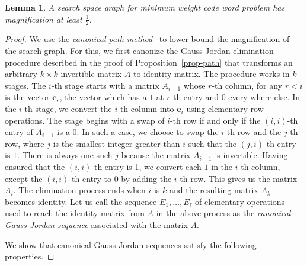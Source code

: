 \documentclass{sig-alternate-2013}
\newtheorem{lemma}[theorem]{Lemma}
\begin{document}
\begin{lemma}
  \label{lem-magnification}
  A search space graph for minimum weight code word problem has
  magnification at least $\frac{1}{2}$.
\end{lemma}
\begin{proof}
  We use the \emph{canonical path
    method}~\cite{cannonical-path-reference} to lower-bound the
  magnification of the search graph. For this, we first canonize the
  Gauss-Jordan elimination procedure described in the proof of
  Proposition~\ref{prop-path} that transforms an arbitrary $k\times k$
  invertible matrix $A$ to identity matrix. The procedure works in
  $k$-stages. The $i$-th stage starts with a matrix $A_{i-1}$ whose
  $r$-th column, for any $r < i$ is the vector $\mathbf{e}_r$, the
  vector which has a $1$ at $r$-th entry and $0$ every where else. In
  the $i$-th stage, we convert the $i$-th column into $\mathbf{e}_i$
  using elementary row operations. The stage begins with a swap of
  $i$-th row if and only if the $(i,i)$-th entry of $A_{i-1}$ is a
  $0$. In such a case, we choose to swap the $i$-th row and the $j$-th
  row, where $j$ is the smallest integer greater than $i$ such that
  the $(j,i)$-th entry is $1$. There is always one such $j$ because
  the matrix $A_{i-1}$ is invertible. Having ensured that the
  $(i,i)$-th entry is 1, we convert each $1$ in the $i$-th column,
  except the $(i,i)$-th entry to 0 by adding the $i$-th row. This
  gives us the matrix $A_i$. The elimination process ends when $i$ is
  $k$ and the resulting matrix $A_k$ becomes identity. Let us call the
  sequence $E_1,\ldots,E_\ell$ of elementary operations used to reach
  the identity matrix from $A$ in the above process as the
  \emph{canonical Gauss-Jordan sequence} associated with the matrix
  $A$.

  We show that canonical Gauss-Jordan sequences satisfy the following
  properties.


\end{proof}
\end{document}

